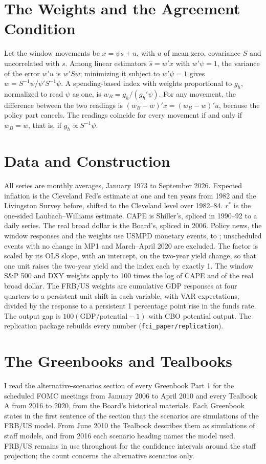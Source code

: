 \documentclass[11pt]{article}
\newcommand{\rs}{r^{*}}
\begin{document}
\newpage
\begin{appendices}
\section{The Weights and the Agreement Condition}\label{app:derivation}
Let the window movements be $x=\psi s+u$, with $u$ of mean zero, covariance $S$ and uncorrelated with $s$. Among linear estimators $\hat s=w'x$ with $w'\psi=1$, the variance of the error $w'u$ is $w'Sw$; minimizing it subject to $w'\psi=1$ gives $w=S^{-1}\psi/\psi'S^{-1}\psi$. A spending-based index with weights proportional to $g_h$, normalized to read $\psi$ as one, is $w_B=g_h/(g_h'\psi)$. For any movement, the difference between the two readings is $(w_B-w)'x=(w_B-w)'u$, because the policy part cancels. The readings coincide for every movement if and only if $w_B=w$, that is, if $g_h\propto S^{-1}\psi$.

\section{Data and Construction}\label{app:data}
All series are monthly averages, January 1973 to September 2026. Expected inflation is the Cleveland Fed's estimate at one and ten years from 1982 and the Livingston Survey before, shifted to the Cleveland level over 1982--84. $\rs$ is the one-sided Laubach--Williams estimate. CAPE is Shiller's, spliced in 1990--92 to a daily series. The real broad dollar is the Board's, spliced in 2006. Policy news, the window responses and the weights use  USMPD monetary events,  to ; unscheduled events with no change in MP1 and March--April 2020 are excluded. The factor is scaled by its OLS slope, with an intercept, on the two-year yield change, so that one unit raises the two-year yield and the index each by exactly 1. The window S\&P 500 and DXY weights apply to 100 times the log of CAPE and of the real broad dollar. The FRB/US weights are cumulative GDP responses at four quarters to a persistent unit shift in each variable, with VAR expectations, divided by the response to a persistent 1 percentage point rise in the funds rate. The output gap is $100(\text{GDP}/\text{potential}-1)$ with CBO potential output. The replication package rebuilds every number (\texttt{fci\_paper/replication}).

\section{The Greenbooks and Tealbooks}\label{app:tealbook}
I read the alternative-scenarios section of every Greenbook Part 1 for the scheduled FOMC meetings from January 2006 to April 2010 and every Tealbook A from 2016 to 2020, from the Board's historical materials. Each Greenbook states in the first sentence of the section that the scenarios are simulations of the FRB/US model. From June 2010 the Tealbook describes them as simulations of staff models, and from 2016 each scenario heading names the model used. FRB/US remains in use throughout for the confidence intervals around the staff projection; the count concerns the alternative scenarios only.
\end{appendices}
\end{document}
